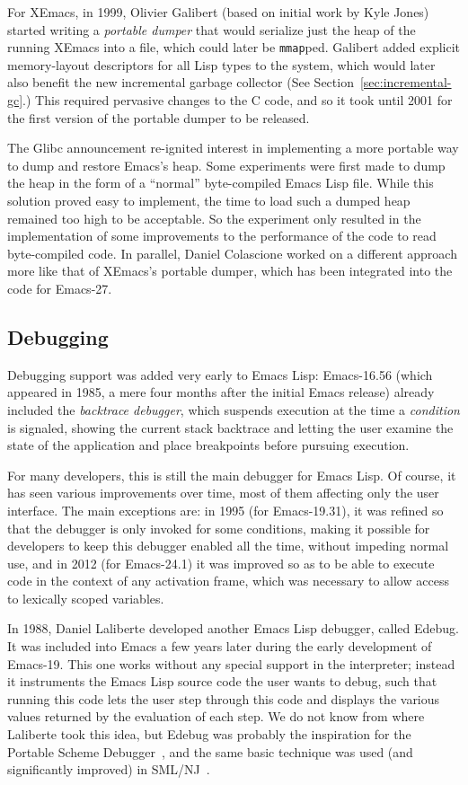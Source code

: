\documentclass[format=acmsmall, review]{acmart}
\newcommand \Elisp {Emacs Lisp}
\begin{document}
For XEmacs, in 1999, Olivier Galibert (based on initial work by Kyle
Jones) started writing a \emph{portable dumper} that would serialize
just the heap of the running XEmacs into a file, which could later be
\texttt{mmap}ped.  Galibert added explicit memory-layout descriptors
for all Lisp types to the system, which would later also benefit the
new incremental garbage collector (See
Section~\ref{sec:incremental-gc}.)  This required pervasive changes to
the C code, and so it took until 2001 for the first version of the
portable dumper to be released.

The Glibc announcement re-ignited interest in implementing a more portable
way to dump and restore Emacs's heap.  Some experiments were first made to dump
the heap in the form of a ``normal'' byte-compiled \Elisp{} file.
While this solution proved easy to implement, the time to load such a dumped
heap remained too high to be acceptable.  So the experiment only resulted in
the implementation of some improvements to the performance of the code to
read byte-compiled code.  In parallel, Daniel Colascione worked on
a different approach more like that of XEmacs's portable dumper, which has
been integrated into the code for Emacs-27.

\subsection{Debugging}
\label{sec:debugger}

Debugging support was added very early to \Elisp: Emacs-16.56 (which
appeared in 1985, a mere four months after the initial Emacs release) already
included the \emph{backtrace debugger}, which suspends execution at the time
a \emph{condition} is signaled, showing the current stack backtrace and
letting the user examine the state of the application and place breakpoints
before pursuing execution.

For many developers, this is still the main debugger for \Elisp{}.
Of course, it has seen various improvements over time, most of them
affecting only the user interface.  The main exceptions are:
in 1995 (for Emacs-19.31), it was refined so that the debugger is only
invoked for some conditions, making it possible for developers to keep this
debugger enabled all the time, without impeding normal use, and in 2012
(for Emacs-24.1) it was improved so as to be able to execute code in the
context of any activation frame, which was necessary to allow access to
lexically scoped variables.

In 1988, Daniel Laliberte developed another \Elisp{} debugger, called
Edebug.  It was included into Emacs a few years later during the early
development of Emacs-19.  This one works without any special support in the
interpreter; instead it instruments the \Elisp{} source code the user wants to
debug, such that running this code lets the user step through this code and
displays the various values returned by the evaluation of each step.  We do
not know from where Laliberte took this idea, but Edebug was probably the
inspiration for the Portable Scheme Debugger~\cite{Kellomaki93}, and the
same basic technique was used (and significantly improved) in
SML/NJ~\cite{Tolmach90}.
\end{document}
